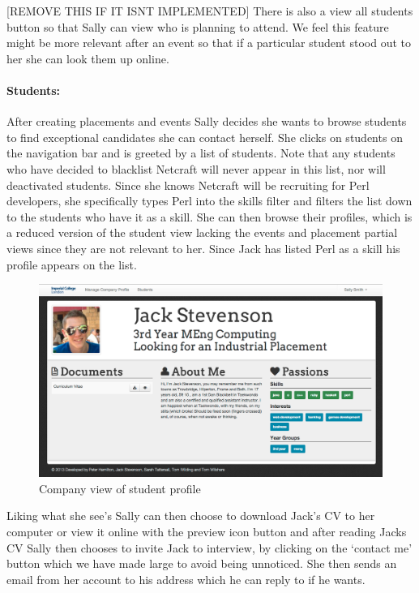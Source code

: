     [REMOVE THIS IF IT ISNT IMPLEMENTED] There is also a view all students button so that Sally can view who is planning to attend. We feel this feature might be more relevant after an event so that if a particular student stood out to her she can look them up online.
  
  \paragraph{Students:}
    After creating placements and events Sally decides she wants to browse students to find exceptional candidates she can contact herself. She clicks on students on the navigation bar and is greeted by a list of students. Note that any students who have decided to blacklist Netcraft will never appear in this list, nor will deactivated students.
    Since she knows Netcraft will be recruiting for Perl developers, she specifically types Perl into the skills filter
    and filters the list down to the students who have it as a skill.
    She can then browse their profiles, which is a reduced version of the student view lacking the events and placement partial views since they are not relevant to her. Since Jack has listed Perl as a skill his profile appears on the list.

    \begin{figure}[H]\centering
    \includegraphics[scale=0.3]{images/user_experiences/company/jack_profile}
    \caption{Company view of student profile}
    \end{figure}

    Liking what she see's Sally can then choose to download Jack's CV to her computer or view it online with the preview icon button and after reading Jacks CV Sally then chooses to invite Jack to interview, by clicking on the `contact me' button which we have made large to avoid being unnoticed. She then sends an email from her account to his address which he can reply to if he wants. 

